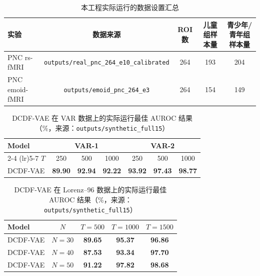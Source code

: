 
\begin{table}[h]
  \centering
  \caption{本工程实际运行的数据设置汇总}
  \label{tab:actual_data_setting}
  \begin{tabular}{lcccc}
    \hline
    实验 & 数据来源 & ROI 数 & 儿童组样本量 & 青少年/青年组样本量 \\
    \hline
    PNC rs-fMRI & \texttt{outputs/real\_pnc\_264\_e10\_calibrated} & 264 & 193 & 204 \\
    PNC emoid-fMRI & \texttt{outputs/emoid\_pnc\_264\_e3} & 264 & 154 & 149 \\
    \hline
  \end{tabular}
\end{table}

\begin{table}[h]
  \centering
  \caption{DCDF-VAE 在 VAR 数据上的实际运行最佳 AUROC 结果（\%，来源：\texttt{outputs/synthetic\_full15}）}
  \label{tab:var_results_actual}
  \begin{tabular}{lcccccc}
    \toprule
    Model & \multicolumn{3}{c}{VAR-1} & \multicolumn{3}{c}{VAR-2} \\
    \cmidrule(lr){2-4} \cmidrule(lr){5-7}
    $T$ & 250 & 500 & 1000 & 250 & 500 & 1000 \\
    \midrule
    DCDF-VAE & \textbf{89.90} & \textbf{92.94} & \textbf{92.22} & \textbf{93.92} & \textbf{97.43} & \textbf{98.77} \\
    \bottomrule
  \end{tabular}
\end{table}

\begin{table}[htbp]
  \centering
  \caption{DCDF-VAE 在 Lorenz--96 数据上的实际运行最佳 AUROC 结果（\%，来源：\texttt{outputs/synthetic\_full15}）}
  \label{tab:Lorenz_experiment_actual}
  \begin{tabular}{lcccc}
    \toprule
    Model & $N$ & $T=500$ & $T=1000$ & $T=1500$ \\
    \midrule
    DCDF-VAE & $N=30$ & \textbf{89.65} & \textbf{95.37} & \textbf{96.86} \\
    DCDF-VAE & $N=40$ & \textbf{87.53} & \textbf{93.34} & \textbf{97.70} \\
    DCDF-VAE & $N=50$ & \textbf{91.22} & \textbf{97.82} & \textbf{98.68} \\
    \bottomrule
  \end{tabular}
\end{table}

